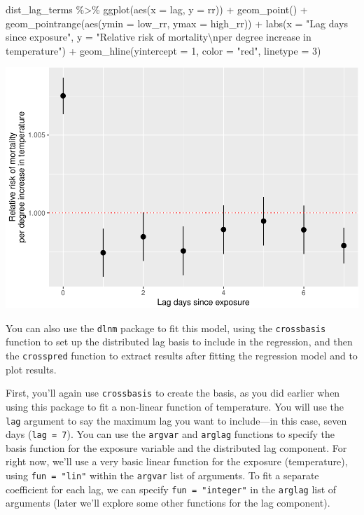 \documentclass[
]{book}
\newenvironment{Shaded}{\begin{snugshade}}{\end{snugshade}}
\newcommand{\AttributeTok}[1]{\textcolor[rgb]{0.77,0.63,0.00}{#1}}
\newcommand{\DecValTok}[1]{\textcolor[rgb]{0.00,0.00,0.81}{#1}}
\newcommand{\FunctionTok}[1]{\textcolor[rgb]{0.00,0.00,0.00}{#1}}
\newcommand{\NormalTok}[1]{#1}
\newcommand{\SpecialCharTok}[1]{\textcolor[rgb]{0.00,0.00,0.00}{#1}}
\newcommand{\StringTok}[1]{\textcolor[rgb]{0.31,0.60,0.02}{#1}}
\begin{document}
\begin{Shaded}
\begin{Highlighting}[]
\NormalTok{dist\_lag\_terms }\SpecialCharTok{\%\textgreater{}\%} 
  \FunctionTok{ggplot}\NormalTok{(}\FunctionTok{aes}\NormalTok{(}\AttributeTok{x =}\NormalTok{ lag, }\AttributeTok{y =}\NormalTok{ rr)) }\SpecialCharTok{+} 
  \FunctionTok{geom\_point}\NormalTok{() }\SpecialCharTok{+} 
  \FunctionTok{geom\_pointrange}\NormalTok{(}\FunctionTok{aes}\NormalTok{(}\AttributeTok{ymin =}\NormalTok{ low\_rr, }\AttributeTok{ymax =}\NormalTok{ high\_rr)) }\SpecialCharTok{+} 
  \FunctionTok{labs}\NormalTok{(}\AttributeTok{x =} \StringTok{"Lag days since exposure"}\NormalTok{, }
       \AttributeTok{y =} \StringTok{"Relative risk of mortality}\SpecialCharTok{\textbackslash{}n}\StringTok{per degree increase in temperature"}\NormalTok{) }\SpecialCharTok{+} 
  \FunctionTok{geom\_hline}\NormalTok{(}\AttributeTok{yintercept =} \DecValTok{1}\NormalTok{, }\AttributeTok{color =} \StringTok{"red"}\NormalTok{, }\AttributeTok{linetype =} \DecValTok{3}\NormalTok{)}
\end{Highlighting}
\end{Shaded}

\includegraphics{adv_epi_analysis_files/figure-latex/unnamed-chunk-90-1.pdf}

You can also use the \texttt{dlnm} package to fit this model, using the \texttt{crossbasis} function
to set up the distributed lag basis to include in the regression, and then the \texttt{crosspred}
function to extract results after fitting the regression model and to plot results.

First, you'll again use \texttt{crossbasis} to create the basis, as you did earlier when using this
package to fit a non-linear function of temperature. You will use the \texttt{lag} argument to say
the maximum lag you want to include---in this case, seven days (\texttt{lag\ =\ 7}). You can use
the \texttt{argvar} and \texttt{arglag} functions to specify the basis function for the exposure variable
and the distributed lag component. For right now, we'll use a very basic linear function for
the exposure (temperature), using \texttt{fun\ =\ "lin"} within the \texttt{argvar} list of arguments.
To fit a separate coefficient for each lag, we can specify \texttt{fun\ =\ "integer"} in the
\texttt{arglag} list of arguments (later we'll explore some other functions for the lag component).
\end{document}
